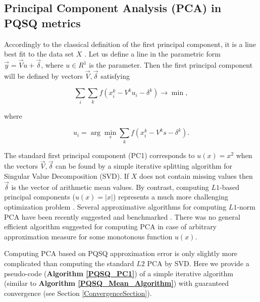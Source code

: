 \documentclass[preprint,12pt]{elsarticle}
\begin{document}
\subsection{Principal Component Analysis (PCA) in PQSQ metrics}

Accordingly to the classical definition of the first principal component, it is a line best fit to the data set $X$ \cite{Pearson1901On}. Let us define a line in the parametric form $\vec{y}=\vec{V}u+\vec{\delta}$, where $u \in R^1$ is the parameter. Then the first principal component will be defined by vectors $\vec{V}, \vec{\delta}$ satisfying

\begin{equation}
\sum_i\sum_k f(x_i^k-V^ku_i-\delta^k) \rightarrow \min,
\end{equation}

\noindent where

\begin{equation}
u_i = \arg \min_s \sum_k f(x_i^k-V^ks-\delta^k).
\end{equation}

The standard first principal component (PC1) corresponds to $u(x)=x^2$ when the vectors $\vec{V}, \vec{\delta}$ can be found by a simple iterative splitting algorithm for Singular Value Decomposition (SVD). If $X$ does not contain missing values then $\vec{\delta}$ is the vector of arithmetic mean values. By contrast, computing $L1$-based principal components ($u(x)=|x|$) represents a much more challenging optimization problem \cite{Brooks2013}. Several approximative algorithms for computing $L1$-norm PCA have been recently suggested and benchmarked \cite{}. There was no general efficient algorithm suggested for computing PCA in case of arbitrary approximation measure for some monotonous function $u(x)$.

Computing PCA based on PQSQ approximation error is only slightly more complicated than computing the standard $L2$ PCA by SVD. Here we provide a pseudo-code (\textbf{Algorithm \ref{PQSQ_PC1}}) of a simple iterative algorithm (similar to \textbf{Algorithm \ref{PQSQ_Mean_Algorithm}}) with guaranteed convergence (see Section \ref{ConvergenceSection}).
\end{document}
